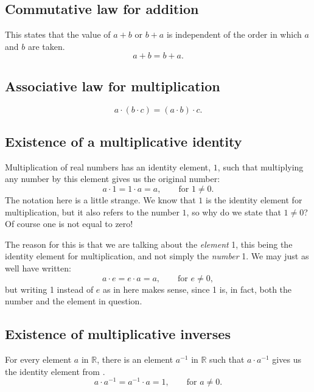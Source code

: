 \subsection{Commutative law for addition}
\label{sec:comm:add}
This states that the value of $a + b$ or $b + a$ is independent of the order
in which $a$ and $b$ are taken.\cite[p.~14]{pinter}
\begin{equation}
    a + b = b + a.
\end{equation}

\subsection{Associative law for multiplication}
\begin{equation}
    a \cdot (b \cdot c) = (a \cdot b) \cdot c.
\end{equation}

\subsection{Existence of a multiplicative identity}
\label{sec:mult:id}
Multiplication of real numbers has an identity element, $1$,
such that multiplying any number by this element gives us the original number:
\begin{equation}
    a \cdot 1 = 1 \cdot a = a, \qquad \text{for } 1 \neq 0.
    \label{eq:mult:id}
\end{equation}
The notation here is a little strange.
We know that $1$ is the identity element for multiplication, but it also
refers to the number $1$, so why do we state that $1 \neq 0$?
Of course one is not equal to zero!

The reason for this is that we are talking about the \emph{element} 1, this
being the identity element for multiplication, and not simply the \emph{number}
1. We may just as well have written:
\begin{equation*}
    a \cdot e = e \cdot a = a, \qquad \text{for } e \neq 0,
\end{equation*}
but writing 1 instead of $e$ as in  here makes sense,
since 1 is, in fact, both the number and the element in question.

\subsection{Existence of multiplicative inverses}
For every element $a$ in $\mathbb{R}$, there is an element $a^{-1}$ in 
$\mathbb{R}$ such that $a \cdot a^{-1}$ gives us the identity element
from .
\begin{equation}
    a \cdot a^{-1} = a^{-1} \cdot a = 1, \qquad \text{for } a \neq 0.
\end{equation}

